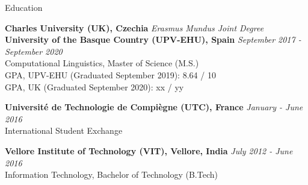 \documentclass{resume}
\begin{document}



\begin{rSection}{Education}

    {\bf Charles University (UK), Czechia} \hfill 
        {\em Erasmus Mundus Joint Degree}\\
    {\bf University of the Basque Country (UPV-EHU), Spain} \hfill 
        {\em September 2017 - September 2020}\\
            Computational Linguistics, Master of Science (M.S.)\\
            GPA, UPV-EHU (Graduated September 2019): 8.64 / 10\\
            GPA, UK (Graduated September 2020): xx / yy
    
    {\bf Universit\'e de Technologie de Compi\`egne (UTC), France} \hfill
        {\em January - June 2016}\\
            International Student Exchange
            
    {\bf Vellore Institute of Technology (VIT), Vellore, India} \hfill
        {\em July 2012 - June 2016}\\
            Information Technology, Bachelor of Technology (B.Tech)
    
\end{rSection}

\end{document}
